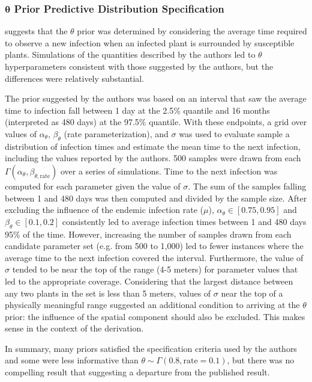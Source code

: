 \documentclass{uwstat572}
\begin{document}
\subsubsection{$\boldsymbol{\theta}$ Prior Predictive Distribution Specification}
\citet{Brown} suggests that the $\theta$ prior was determined by considering the average time required to observe a new infection when an infected plant is surrounded by susceptible plants. 
Simulations of the quantities described by the authors led to $\theta$ hyperparameters consistent with those suggested by the authors, but the differences were relatively substantial.

The prior suggested by the authors was based on an interval that saw the average time to infection fall between 1 day at the 2.5\% quantile and 16 months (interpreted as 480 days) at the 97.5\% quantile. 
With these endpoints, a grid over values of $\alpha_{\theta}$, $\beta_{\theta}$ (rate parameterization), and $\sigma$ was used to evaluate sample a distribution of infection times and estimate the mean time to the next infection, including the values reported by the authors. 
500 samples were drawn from each $\Gamma(\alpha_{\theta}, \beta_{\theta, \text{rate}})$ over a series of simulations. 
Time to the next infection was computed for each parameter given the value of $\sigma$. 
The sum of the samples falling between 1 and 480 days was then computed and divided by the sample size. 
After excluding the influence of the endemic infection rate ($\mu$), $\alpha_{\theta} \in [0.75, 0.95]$ and $\beta_{\theta} \in [0.1, 0.2]$  consistently led to average infection times between 1 and 480 days 95\% of the time.  
However, increasing the number of samples drawn from each candidate parameter set (e.g. from 500 to 1,000) led to fewer instances where the average time to the next infection covered the interval. 
Furthermore, the value of $\sigma$ tended to be near the top of the range (4-5 meters) for parameter values that led to the appropriate coverage. 
Considering that the largest distance between any two plants in the set is less than 5 meters, values of $\sigma$ near the top of a physically meaningful range suggested an additional condition to arriving at the $\theta$ prior: the influence of the spatial component should also be excluded. 
This makes sense in the context of the derivation. 

In summary, many priors satisfied the specification criteria used by the authors and some were less informative than $\theta \sim \Gamma(0.8, \text{rate}=0.1)$, but there was no compelling result that suggesting a departure from the published result. 
\end{document}
